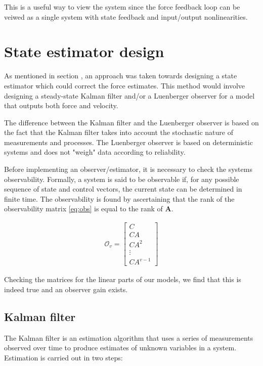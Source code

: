 This is a useful way to view the system since the force feedback loop can be veiwed as a single system with state feedback and input/output nonlinearities.

\section{State estimator design}
As mentioned in section , an approach was taken towards designing a state estimator which could correct the force estimates.
This method would involve designing a steady-state Kalman filter \cite{brown1997introduction} and/or a Luenberger observer \cite{friedland2012control} for a model that outputs both force and velocity.

The difference between the Kalman filter and the Luenberger observer is based on the fact that the Kalman filter takes into account the stochastic nature of measurements and processes. The Luenberger observer is based on deterministic systems and does not "weigh" data according to reliability.

Before implementing an observer/estimator, it is necessary to check the  systems observability.
Formally, a system is said to be observable if, for any possible sequence of state and control vectors, the current state can be determined in finite time.
The observability is found by ascertaining that the rank of the observability matrix \eqref{eq:obs} is equal to the rank of $\mathbf{A}$.

\begin{align}\label{eq:obs}
\mathcal{O}_v=\begin{bmatrix} C \\ CA \\ CA^2 \\ \vdots \\ CA^{v-1} \end{bmatrix}
\end{align}

Checking the matrices for the linear parts of our models, we find that this is indeed true and an observer gain exists.

\subsection{Kalman filter}
The Kalman filter is an estimation algorithm that uses a series of measurements observed over time to produce estimates of unknown variables in a system.
Estimation is carried out in two steps:

